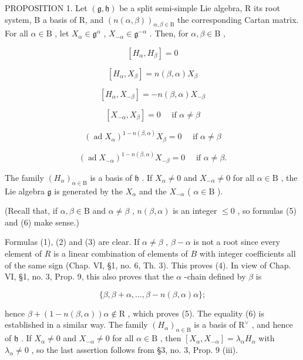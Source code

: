 PROPOSITION 1. Let \((\mathfrak{g},\mathfrak{h})\) be a split semi-simple Lie algebra, R its root system, B a basis of R, and \((n(\alpha ,\beta))_{\alpha ,\beta \in \mathrm{B}}\) the corresponding Cartan matrix. For all \(\alpha \in \mathrm{B}\) , let \(X_{\alpha}\in \mathfrak{g}^{\alpha}\) , \(X_{-\alpha}\in \mathfrak{g}^{-\alpha}\) . Then, for \(\alpha ,\beta \in \mathrm{B}\) ,

\[
[ H _ {\alpha}, H _ {\beta} ] = 0\tag{1}
\]

\[
[ H _ {\alpha}, X _ {\beta} ] = n (\beta , \alpha) X _ {\beta}\tag{2}
\]

\[
[ H _ {\alpha}, X _ {- \beta} ] = - n (\beta , \alpha) X _ {- \beta}\tag{3}
\]

\[
[ X _ {- \alpha}, X _ {\beta} ] = 0 \quad \text { if } \alpha \neq \beta\tag{4}
\]

\[
(\operatorname{ad} X _ {\alpha}) ^ {1 - n (\beta , \alpha)} X _ {\beta} = 0 \quad \text { if } \alpha \neq \beta\tag{5}
\]

\[
(\operatorname{ad} X _ {- \alpha}) ^ {1 - n (\beta , \alpha)} X _ {- \beta} = 0 \quad \text { if } \alpha \neq \beta .\tag{6}
\]

The family \((H_{\alpha})_{\alpha \in \mathrm{B}}\) is a basis of \(\mathfrak{h}\) . If \(X_{\alpha} \neq 0\) and \(X_{-\alpha} \neq 0\) for all \(\alpha \in \mathrm{B}\) , the Lie algebra \(\mathfrak{g}\) is generated by the \(X_{\alpha}\) and the \(X_{-\alpha}\) ( \(\alpha \in \mathrm{B}\) ).

(Recall that, if \(\alpha, \beta \in \mathrm{B}\) and \(\alpha \neq \beta\) , \(n(\beta, \alpha)\) is an integer \(\leq 0\) , so formulas (5) and (6) make sense.)

Formulas (1), (2) and (3) are clear. If \(\alpha \neq \beta\) , \(\beta - \alpha\) is not a root since every element of \(R\) is a linear combination of elements of \(B\) with integer coefficients all of the same sign (Chap. VI, §1, no. 6, Th. 3). This proves (4). In view of Chap. VI, §1, no. 3, Prop. 9, this also proves that the \(\alpha\) -chain defined by \(\beta\) is

\[
\{\beta , \beta + \alpha , \dots , \beta - n (\beta , \alpha) \alpha \};
\]

hence \(\beta + (1 - n(\beta, \alpha))\alpha \notin \mathrm{R}\) , which proves (5). The equality (6) is established in a similar way. The family \((H_{\alpha})_{\alpha \in \mathrm{B}}\) is a basis of \(\mathrm{R}^{\vee}\) , and hence of \(\mathfrak{h}\) . If \(X_{\alpha} \neq 0\) and \(X_{-\alpha} \neq 0\) for all \(\alpha \in \mathrm{B}\) , then \([X_{\alpha}, X_{-\alpha}] = \lambda_{\alpha}H_{\alpha}\) with \(\lambda_{\alpha} \neq 0\) , so the last assertion follows from §3, no. 3, Prop. 9 (iii).

